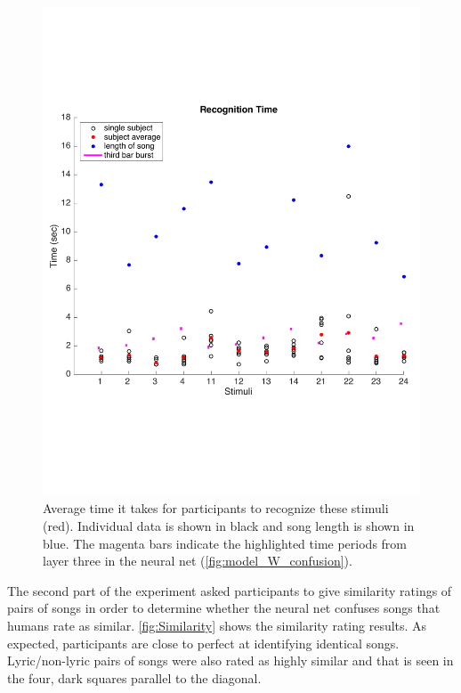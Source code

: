 \begin{figure}[h] 
  \begin{center}
        \includegraphics[scale=0.7]{Figures/RecognitionTimeGraph}
    \caption{Average time it takes for participants to recognize these stimuli (red). Individual data is shown in black and song length is shown in blue. The magenta bars indicate the highlighted time periods from layer three in the neural net (\autoref{fig:model_W_confusion}).}
    \label{fig:RecognitionTime}
  \end{center}
\end{figure}

The second part of the experiment asked participants to give similarity ratings of pairs of songs in order to determine whether the neural net confuses songs that humans rate as similar. 
\autoref{fig:Similarity} shows the similarity rating results. 
As expected, participants are close to perfect at identifying identical songs. 
Lyric/non-lyric pairs of songs were also rated as highly similar and that is seen in the four, dark squares parallel to the diagonal.

